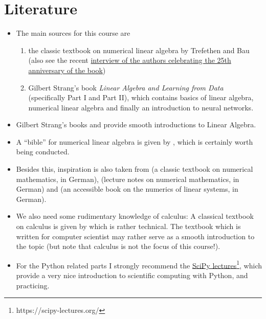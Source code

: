 \documentclass{article}
\begin{document}
\section{Literature}
\begin{itemize}
	\item The main sources for this course are 
	\begin{enumerate}
		\item the classic textbook on numerical linear algebra \cite{TreBau} by Trefethen and Bau (also see the recent \href{https://www.youtube.com/watch?v=yCLE7lGuhuo}{interview of the authors celebrating the 25th anniversary of the book}) 
		\item  Gilbert Strang's book \textit{Linear Algebra and Learning from Data} \cite{StrangData} (specifically Part I and Part II), which contains basics of linear algebra, numerical linear algebra and finally an introduction to neural networks.
	\end{enumerate}
	\item Gilbert Strang's books \cite{StrangLA_intro} and \cite{StrangLA_new} provide smooth introductions to Linear Algebra.
	\item A ``bible'' for numerical linear algebra is given by \cite{Golub}, which is certainly worth being conducted. %
	\item Besides this, inspiration is also taken from \cite{Deuflhard} (a classic textbook on numerical mathematics, in German), \cite{Rannacher} (lecture notes on numerical mathematics, in German) and \cite{Meister} (an accessible book on the numerics of linear systems, in German).
	\item We also need some rudimentary knowledge of calculus: A classical textbook on calculus is given by \cite{rudin} which is rather technical. The textbook \cite{AnalysisComputerSc} which is written for computer scientist may rather serve as a smooth introduction to the topic (but note that calculus is not the focus of this course!).
	\item For the Python related parts I strongly recommend the \hyperref{https://scipy-lectures.org/}{}{}{SciPy lectures}\footnote{https://scipy-lectures.org/}, which provide a very nice introduction to scientific computing with Python, and practicing. 
\end{itemize}


\nocite*{}  
\end{document}

